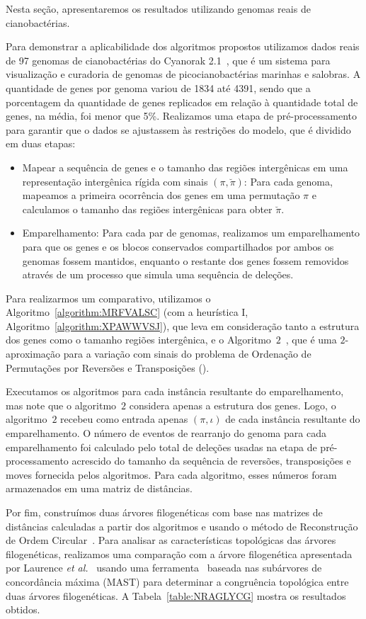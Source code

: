 Nesta seção, apresentaremos os resultados utilizando genomas reais de cianobactérias.

Para demonstrar a aplicabilidade dos algoritmos propostos utilizamos dados reais de 97 genomas de cianobactérias do Cyanorak 2.1~\cite{cyanorak}, que é um sistema para visualização e curadoria de genomas de picocianobactérias marinhas e salobras. A quantidade de genes por genoma variou de 1834 até 4391, sendo que a porcentagem da quantidade de genes replicados em relação à quantidade total de genes, na média, foi menor que 5\%. Realizamos uma etapa de pré-processamento para garantir que o dados se ajustassem às restrições do modelo, que é dividido em duas etapas:
\begin{itemize}
  \item Mapear a sequência de genes e o tamanho das regiões intergênicas em uma representação intergênica rígida com sinais $(\pi,\breve\pi)$: Para cada genoma, mapeamos a primeira ocorrência dos genes em uma permutação $\pi$ e calculamos o tamanho das regiões intergênicas para obter $\breve\pi$.
  \item Emparelhamento: Para cada par de genomas, realizamos um emparelhamento para que os genes e os blocos conservados compartilhados por ambos os genomas fossem mantidos, enquanto o restante dos genes fossem removidos através de um processo que simula uma sequência de deleções.
\end{itemize}

Para realizarmos um comparativo, utilizamos o Algoritmo~\ref{algorithm:MRFVALSC} (com a heurística I, Algoritmo~\ref{algorithm:XPAWWVSJ}), que leva em consideração tanto a estrutura dos genes como o tamanho regiões intergênica, e o Algoritmo~$2$\SbRT{}~\cite{1998-walter-etal}, que é uma $2$-aproximação para a variação com sinais do problema de Ordenação de Permutações por Reversões e Transposições (\SbRT).

Executamos os algoritmos para cada instância resultante do emparelhamento, mas note que o algoritmo~$2$\SbRT{} considera apenas a estrutura dos genes. Logo, o algoritmo~$2$\SbRT{} recebeu como entrada apenas $(\pi,\iota)$ de cada instância resultante do emparelhamento. O número de eventos de rearranjo do genoma para cada emparelhamento foi calculado pelo total de deleções usadas na etapa de pré-processamento acrescido do tamanho da sequência de reversões, transposições e moves fornecida pelos algoritmos. Para cada algoritmo, esses números foram armazenados em uma matriz de distâncias.

Por fim, construímos duas árvores filogenéticas com base nas matrizes de distâncias calculadas a partir dos algoritmos e usando o método de Reconstrução de Ordem Circular~\cite{makarenkov1997tree}. Para analisar as características topológicas das árvores filogenéticas, realizamos uma comparação com a árvore filogenética apresentada por Laurence \textit{et al.}~\cite{garczarek2020cyanorak} usando uma ferramenta~\cite{de2007congruence} baseada nas subárvores de concordância máxima (MAST) para determinar a congruência topológica entre duas árvores filogenéticas. A Tabela~\ref{table:NRAGLYCG} mostra os resultados obtidos.

